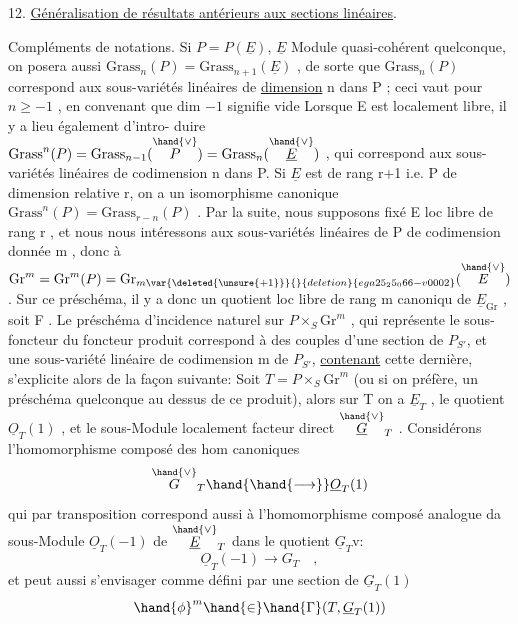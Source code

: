 
12. \uline{Généralisation de résultats antérieurs aux sections linéaires}.

Compléments de notations. Si $P = P(\underline{E})$, $\underline{E}$ Module quasi-cohérent
quelconque, on posera aussi $\mathrm{Grass}_n(P) = \mathrm{Grass}_{n+1}(\underline{E})$ , de sorte que
$\mathrm{Grass}_n(P)$ correspond aux sous-variétés linéaires de \uline{dimension} n dans
P ; ceci vaut pour $n \geq -1$ , en convenant que dim $-1$ signifie vide
Lorsque E est localement libre,  il y a lieu également d'intro-%
duire $\mathrm{Grass}^n(P) = \mathrm{Grass}_{n-1}(\overset{\hand{\vee}}{P}) = \mathrm{Grass}_n(\overset{\hand{\vee}}{\underline{E}})$ , qui correspond aux sous-%
variétés linéaires de codimension n dans P. Si $\underline{E}$ est de rang r+1 i.e.
P de dimension relative r, on a un isomorphisme canonique
$\mathrm{Grass}^n(P) = \mathrm{Grass}_{r-n}(P)$ . Par la suite, nous supposons fixé E loc
libre de rang r , et nous nous intéressons aux sous-variétés linéaires
de P de codimension donnée m , donc à $\mathrm{Gr}^m = \mathrm{Gr}^m(P) = \mathrm{Gr}_{m\var{\deleted{\unsure{+1}}}{}{deletion}{ega25_25_066-v0002}}(\overset{\hand{\vee}}{E})$ .
Sur ce préschéma, il y a donc un quotient  loc libre de rang m canoniqu
de $\underline{E}_{\mathrm{Gr}}$ , soit F .  Le préschéma d'incidence naturel
sur $P\times_S \mathrm{Gr}^m$ , qui représente le sous-foncteur du foncteur produit
correspond à des couples d'une section de $P_{S'}$, et une sous-variété
linéaire de codimension m de $P_{S'}$, \uline{contenant} cette dernière, s'explicite
alors de la façon suivante: Soit $T=P\times_S \mathrm{Gr}^m$ (ou si on préfère, un
préschéma quelconque au dessus de ce produit), alors sur  T on a
$\underline{E}_T$ , le quotient $\underline{O}_T(1)$ , et le sous-Module localement facteur direct
$\overset{\hand{\vee}}{\underline{G}}_T$ . Considérons l'homomorphisme composé des hom canoniques
\[ \overset{\hand{\vee}}{G}_T \hand{\hand{\longrightarrow}} \underline{O}_T(1) \]
qui par transposition correspond aussi à l'homomorphisme composé
analogue da sous-Module $\underline{O}_T(-1)$ de $\overset{\hand{\vee}}{\underline{E}}_T$ dans le quotient $\underline{G}_T\mathrm{v}$:
\[ \underline{O}_T(-1) \longrightarrow G_T \quad , \]
et peut aussi s'envisager comme défini par une section de $\underline{G}_T(1)$
\[ \hand{\phi}^m \hand{\in} \hand{\Gamma}(T, \underline{G}_T(1)) \]

